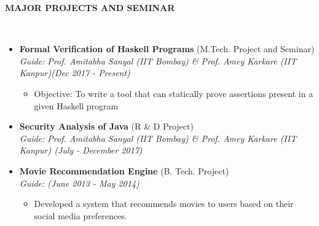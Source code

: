 \documentclass[a4paper,10pt]{article}
\newcommand{\isep}{-2 pt}
\newcommand{\lsep}{-0.5cm}
\newcommand{\resheading}[1]{{\small \colorbox{mygrey}{\begin{minipage}{0.975\textwidth}{\textbf{#1 \vphantom{p\^{E}}}}\end{minipage}}}}
\begin{document}
\resheading{\textbf{MAJOR PROJECTS AND SEMINAR} }\\[\lsep]
\begin{itemize}
\itemsep \isep
 
\item \textbf{Formal Verification of Haskell Programs} (M.Tech. Project and Seminar) \\
 \emph{Guide: Prof. Amitabha Sanyal (IIT Bombay) \& Prof. Amey Karkare  (IIT Kanpur)\hfill (Dec 2017 - Present)} \\[-0.6cm]
	\begin{itemize}\itemsep \isep
	\item Objective: To write a tool that can statically prove assertions present in a given Haskell program
	\end{itemize}

\item \textbf{Security Analysis of Java } (R & D Project) \\
 \emph{Guide: Prof. Amitabha Sanyal (IIT Bombay) \& Prof. Amey Karkare  (IIT Kanpur) \hfill (July - December 2017)}

\item \textbf{Movie Recommendation Engine 
} (B. Tech. Project) \\
 \emph{Guide:  \hfill (June 2013 - May 2014)} \\[-0.6cm]
 	\begin{itemize}\itemsep \isep
	\item Developed a system that recommends movies to users based on their social media preferences. \\[-0.4cm]
	\end{itemize}

\end{itemize}
\end{document}
